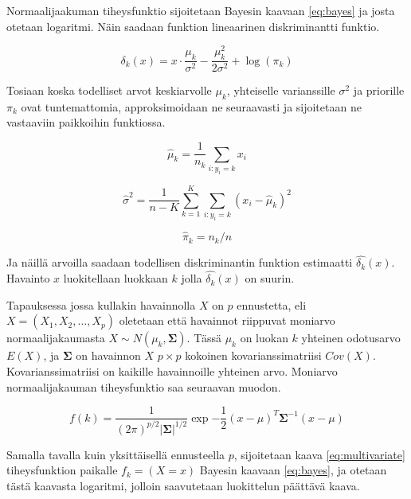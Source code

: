 \documentclass[finnish,twoside,openright]{HYgraduMLDS}
\begin{document}
Normaalijaakuman tiheysfunktio sijoitetaan Bayesin kaavaan \ref{eq:bayes} ja josta otetaan logaritmi. Näin saadaan funktion lineaarinen diskriminantti funktio.

\begin{equation}
    \delta_k(x) = x \cdot \frac{\mu_k}{\sigma^2} - \frac{\mu^2_k}{2 \sigma^2} + \log(\pi_k)
\end{equation}

Tosiaan koska todelliset arvot keskiarvolle $\mu_k$, yhteiselle varianssille $\sigma^2$ ja priorille $\pi_k$ ovat tuntemattomia, approksimoidaan ne seuraavasti ja sijoitetaan ne vastaaviin paikkoihin funktiossa.

\begin{equation} \label{eq:estimate-mu}
    \hat{\mu}_k = \frac{1}{n_k} \sum_{i:y_i = k} x_i
\end{equation}

\begin{equation}
    \hat{\sigma}^2 = \frac{1}{n - K} \sum^K_{k=1} \sum_{i:y_i = k} (x_i - \hat{\mu}_k)^2
\end{equation}

\begin{equation} \label{eq:estimate-pi}
    \hat{\pi}_k = n_k / n
\end{equation}

Ja näillä arvoilla saadaan todellisen diskriminantin funktion estimaatti $\hat{\delta_k}(x)$. Havainto $x$ luokitellaan luokkaan $k$ jolla $\hat{\delta_k}(x)$ on suurin.

Tapauksessa jossa kullakin havainnolla $X$ on $p$ ennustetta, eli $X = (X_1, X_2, \dots, X_p)$ oletetaan että havainnot riippuvat moniarvo normaalijakaumasta $X \sim N(\mu_k, \pmb{\Sigma})$. Tässä $\mu_k$ on luokan $k$ yhteinen odotusarvo $E(X)$, ja $\pmb{\Sigma}$ on havainnon $X$ $p \times p$ kokoinen kovarianssimatriisi $Cov(X)$. Kovarianssimatriisi on kaikille havainnoille yhteinen arvo. Moniarvo normaalijakauman tiheysfunktio saa seuraavan muodon.

\begin{equation} \label{eq:multivariate}
    f(k) = \frac{1}{(2\pi)^{p/2} |\pmb{\Sigma}|^{1/2}} \exp{-\frac{1}{2} (x - \mu)^T \pmb{\Sigma}^{-1} (x - \mu)}
\end{equation}

Samalla tavalla kuin yksittäisellä ennusteella $p$, sijoitetaan kaava \ref{eq:multivariate} tiheysfunktion paikalle $f_k = (X = x)$ Bayesin kaavaan \ref{eq:bayes}, ja otetaan tästä kaavasta logaritmi, jolloin saavutetaan luokittelun päättävä kaava.
\end{document}
